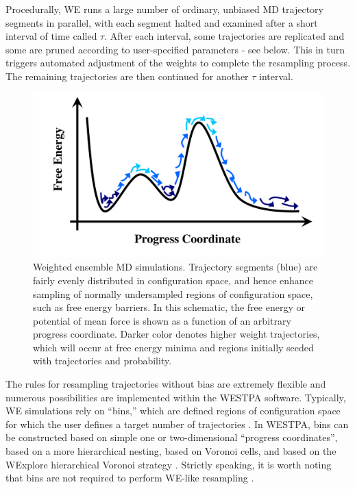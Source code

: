 \documentclass[9pt,tutorial]{livecoms}
\begin{document}
Procedurally, WE runs a large number of ordinary, unbiased MD trajectory segments in parallel, with each segment halted and examined after a short interval of time called $\tau$. 
After each interval, some trajectories are replicated and some are pruned according to user-specified parameters - see below. 
This in turn triggers automated adjustment of the weights to complete the resampling process. 
The remaining trajectories are then continued for another $\tau$ interval.

\begin{figure}
\includegraphics[width=\linewidth]{Figure1.png}
\caption{Weighted ensemble MD simulations. 
Trajectory segments (blue) are fairly evenly distributed in configuration space, and hence enhance sampling of normally undersampled regions of configuration space, such as free energy barriers. 
In this schematic, the free energy or potential of mean force is shown as a function of an arbitrary progress coordinate.
Darker color denotes higher weight trajectories, which will occur at free energy minima and regions initially seeded with trajectories and probability.}
\label{fig:view}
\end{figure}

The rules for resampling trajectories without bias are extremely flexible \citep{Zhang2010} and numerous possibilities are implemented within the WESTPA software. 
Typically, WE simulations rely on “bins,” which are defined regions of configuration space for which the user defines a target number of trajectories \citep{HuberKim1996}. 
In WESTPA, bins can be constructed based on simple one or two-dimensional “progress coordinates”, based on a more hierarchical nesting, based on Voronoi cells, and based on the WExplore hierarchical Voronoi strategy \citep{Zwier2015,Dickson2014}. 
Strictly speaking, it is worth noting that bins are not required to perform WE-like resampling \citep{Dickson2018or19}.
\end{document}
